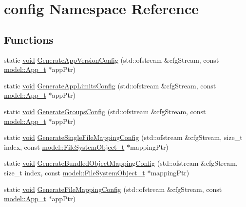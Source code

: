 \hypertarget{namespaceconfig}{}\section{config Namespace Reference}
\label{namespaceconfig}
\subsection*{Functions}
\begin{DoxyCompactItemize}
\item 
static \hyperlink{_t_e_m_p_l_a_t_e__cdef_8h_ac9c84fa68bbad002983e35ce3663c686}{void} \hyperlink{namespaceconfig_ae3e74602c2c915f2c49aae1db1cb133d}{Generate\+App\+Version\+Config} (std\+::ofstream \&cfg\+Stream, const \hyperlink{structmodel_1_1_app__t}{model\+::\+App\+\_\+t} $\ast$app\+Ptr)
\item 
static \hyperlink{_t_e_m_p_l_a_t_e__cdef_8h_ac9c84fa68bbad002983e35ce3663c686}{void} \hyperlink{namespaceconfig_aea0c16c2b995c9fa711a7f7ab22f2316}{Generate\+App\+Limits\+Config} (std\+::ofstream \&cfg\+Stream, const \hyperlink{structmodel_1_1_app__t}{model\+::\+App\+\_\+t} $\ast$app\+Ptr)
\item 
static \hyperlink{_t_e_m_p_l_a_t_e__cdef_8h_ac9c84fa68bbad002983e35ce3663c686}{void} \hyperlink{namespaceconfig_ac75c344806ae709f27c498632c52bf01}{Generate\+Groups\+Config} (std\+::ofstream \&cfg\+Stream, const \hyperlink{structmodel_1_1_app__t}{model\+::\+App\+\_\+t} $\ast$app\+Ptr)
\item 
static \hyperlink{_t_e_m_p_l_a_t_e__cdef_8h_ac9c84fa68bbad002983e35ce3663c686}{void} \hyperlink{namespaceconfig_acae474d7d2c1407ca72c7b76f0d66b95}{Generate\+Single\+File\+Mapping\+Config} (std\+::ofstream \&cfg\+Stream, size\+\_\+t index, const \hyperlink{structmodel_1_1_file_system_object__t}{model\+::\+File\+System\+Object\+\_\+t} $\ast$mapping\+Ptr)
\item 
static \hyperlink{_t_e_m_p_l_a_t_e__cdef_8h_ac9c84fa68bbad002983e35ce3663c686}{void} \hyperlink{namespaceconfig_a4ffc919757682529e4ca1e878a4e8b5b}{Generate\+Bundled\+Object\+Mapping\+Config} (std\+::ofstream \&cfg\+Stream, size\+\_\+t index, const \hyperlink{structmodel_1_1_file_system_object__t}{model\+::\+File\+System\+Object\+\_\+t} $\ast$mapping\+Ptr)
\item 
static \hyperlink{_t_e_m_p_l_a_t_e__cdef_8h_ac9c84fa68bbad002983e35ce3663c686}{void} \hyperlink{namespaceconfig_aacd74d2edfb2f10b2d1ce4229ace8410}{Generate\+File\+Mapping\+Config} (std\+::ofstream \&cfg\+Stream, const \hyperlink{structmodel_1_1_app__t}{model\+::\+App\+\_\+t} $\ast$app\+Ptr)

\end{DoxyCompactItemize}
